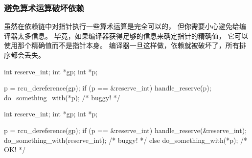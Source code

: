 \subsubsection{避免算术运算破坏依赖}
虽然在依赖链中对指针执行一些算术运算是完全可以的，
但你需要小心避免给编译器太多信息。
毕竟，如果编译器获得足够的信息来确定指针的精确值，
它可以使用那个精确值而不是指针本身。
编译器一旦这样做，依赖就被破坏了，所有排序都会丢失。

\begin{listing}
\begin{fcvlabel}
\begin{VerbatimL}[commandchars=\\\[\]]
int reserve_int;
int *gp;
int *p;

p = rcu_dereference(gp);
if (p == &reserve_int)		\lnlbl[cmp]
	handle_reserve(p);	\lnlbl[handle]
do_something_with(*p); /* buggy! */
\end{VerbatimL}
\end{fcvlabel}
\caption{可被比较破坏的Dependencies}
\label{lst:memorder:Breakable Dependencies With Comparisons}
\end{listing}

\begin{listing}
\begin{fcvlabel}
\begin{VerbatimL}[commandchars=\\\[\]]
int reserve_int;
int *gp;
int *p;

p = rcu_dereference(gp);	\lnlbl[deref1]
if (p == &reserve_int) {
	handle_reserve(&reserve_int);
	do_something_with(reserve_int); /* buggy! */ \lnlbl[deref2]
} else {
	do_something_with(*p); /* OK! */
}
\end{VerbatimL}
\end{fcvlabel}
\caption{被比较破坏的Dependencies}
\label{lst:memorder:Broken Dependencies With Comparisons}
\end{listing}

